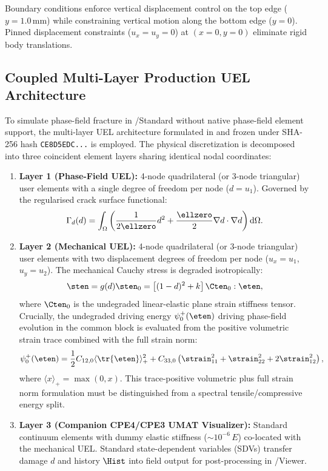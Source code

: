 Boundary conditions enforce vertical displacement control on the top edge ($y = 1.0\,\mathrm{mm}$) while constraining vertical motion along the bottom edge ($y = 0$). Pinned displacement constraints ($u_x = u_y = 0$) at $(x=0, y=0)$ eliminate rigid body translations.

\subsection{Coupled Multi-Layer Production UEL Architecture}
\label{subsec:hole_uel_architecture}

To simulate phase-field fracture in \Abaqus/Standard without native phase-field element support, the multi-layer UEL architecture formulated in \citet{molnar2017} and frozen under SHA-256 hash \texttt{CE8D5EDC...} is employed. The physical discretization is decomposed into three coincident element layers sharing identical nodal coordinates:
\begin{enumerate}
  \item \textbf{Layer 1 (Phase-Field UEL):} 4-node quadrilateral (or 3-node triangular) user elements with a single degree of freedom per node ($d = u_1$). Governed by the regularised crack surface functional:
  \begin{equation}
    \Gamma_d(d) = \int_\Omega \left( \frac{1}{2 \ellzero} d^2 + \frac{\ellzero}{2} \nabla d \cdot \nabla d \right) \mathrm{d}\Omega.
    \label{eq:crack_surface_functional}
  \end{equation}
  \item \textbf{Layer 2 (Mechanical UEL):} 4-node quadrilateral (or 3-node triangular) user elements with two displacement degrees of freedom per node ($u_x = u_1$, $u_y = u_2$). The mechanical Cauchy stress is degraded isotropically:
  \begin{equation}
    \sten = g(d) \sten_0 = \left[ (1-d)^2 + k \right] \Cten_0 : \eten,
    \label{eq:degraded_stress}
  \end{equation}
  where $\Cten_0$ is the undegraded linear-elastic plane strain stiffness tensor. Crucially, the undegraded driving energy $\psi_0^+(\eten)$ driving phase-field evolution in the common block is evaluated from the positive volumetric strain trace combined with the full strain norm:
  \begin{equation}
    \psi_0^+(\eten) = \frac{1}{2} C_{12,0} \langle \tr{\eten} \rangle_+^2 + C_{33,0} \left( \strain_{11}^2 + \strain_{22}^2 + 2 \strain_{12}^2 \right),
    \label{eq:uel_driving_energy}
  \end{equation}
  where $\langle x \rangle_+ = \max(0, x)$. This trace-positive volumetric plus full strain norm formulation must be distinguished from a spectral tensile/compressive energy split.
  \item \textbf{Layer 3 (Companion CPE4/CPE3 UMAT Visualizer):} Standard continuum elements with dummy elastic stiffness ($\sim 10^{-6}\,E$) co-located with the mechanical UEL. Standard state-dependent variables (SDVs) transfer damage $d$ and history $\Hist$ into field output for post-processing in \Abaqus/Viewer.
\end{enumerate}

